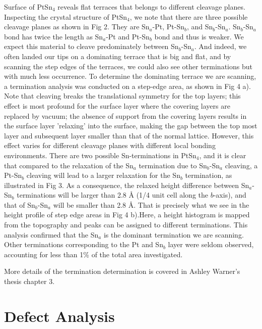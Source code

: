 Surface of PtSn$_4$ reveals flat terraces that belongs to different cleavage planes. Inspecting the crystal structure of PtSn$_4$, we note that there are three possible cleavage planes as shown in Fig 2. They are Sn$_a$-Pt, Pt-Sn$_b$, and Sn$_b$-Sn$_a$. Sn$_b$-Sn$_a$ bond has twice the length as Sn$_a$-Pt and Pt-Sn$_b$ bond and thus is weaker. We expect this material to cleave predominately between Sn$_b$-Sn$_a$. And indeed, we often landed our tips on a dominating terrace that is big and flat, and by scanning the step edges of the terraces, we could also see other terminations but with much less occurrence. To determine the dominating terrace we are scanning, a termination analysis was conducted on a step-edge area, as shown in Fig 4 a). Note that cleaving breaks the translational symmetry for the top layers; this effect is most profound for the surface layer where the covering layers are replaced by vacuum; the absence of support from the covering layers results in the surface layer 'relaxing' into the surface, making the gap between the top most layer and subsequent layer smaller than that of the normal lattice. However, this effect varies for different cleavage planes with different local bonding environments. There are two possible Sn-terminations in PtSn$_4$, and it is clear that compared to the relaxation of the Sn$_a$ termination due to Sn$_b$-Sn$_a$ cleaving, a Pt-Sn$_b$ cleaving will lead to a larger relaxation for the Sn$_b$ termination, as illustrated in Fig 3. As a consequence, the relaxed height difference between Sn$_a$-Sn$_b$ terminations will be larger than 2.8 {\AA} (1/4 unit cell along the $b$-axis), and that of Sn$_b$-Sn$_a$ will be smaller than 2.8 {\AA}. That is precisely what we see in the height profile of step edge areas in Fig 4 b).Here, a height histogram is mapped from the topography and peaks can be assigned to different terminations. This analysis confirmed that the Sn$_a$ is the dominant termination we are scanning. Other terminations corresponding to the Pt and Sn$_b$ layer were seldom observed, accounting for less than 1\% of the total area investigated. 

More details of the termination determination is covered in Ashley Warner's thesis chapter 3.

\section{Defect Analysis}

